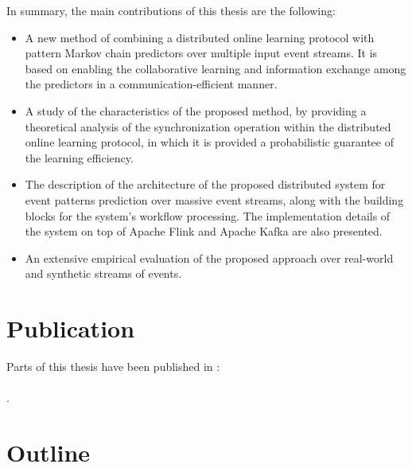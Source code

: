 In summary, the main contributions of this thesis are the following:

\begin{itemize}
	
	\item  A new method of combining a distributed online learning protocol with pattern Markov chain predictors over multiple input event streams. It is based on enabling the collaborative learning and information exchange among the predictors in a communication-efficient manner.  
	
	\item A study of the characteristics of the proposed method, by providing a theoretical analysis of the synchronization operation within the distributed online learning protocol, in which it is provided a probabilistic guarantee of the learning efficiency. 
	
	\item The description of the architecture of the proposed distributed system for event patterns prediction over massive event streams, along with the building blocks for the system's workflow processing. The implementation details of the system on top of Apache Flink and Apache Kafka are also presented. 
	
	\item An extensive empirical evaluation of the proposed approach over real-world and synthetic streams of events.
  
\end{itemize}


\section{Publication}

Parts of this thesis have been published in \cite{Qadah}:\\ \\
.

\section{Outline }

	
